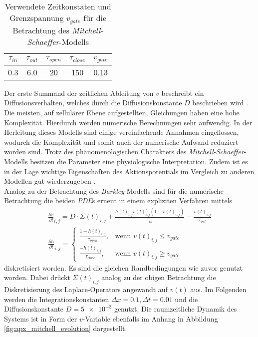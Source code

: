 \begin{table}[H]
\centering
\begin{tabular}{ccccc}
\hline 
$\tau_{in}$ & $\tau_{out}$ & $\tau_{open}$ & $\tau_{close}$ & $v_{gate}$ \\ 
\hline
0.3 & 6.0 & 20 & 150 & 0.13 \\ 
\hline 
\end{tabular} 
\caption{Verwendete Zeitkonstaten und Grenzspannung $v_{gate}$ für die Betrachtung des \textit{Mitchell-Schaeffer}-Modells}
\label{tab:ms_parameters}
\end{table}

Der erste Summand der zeitlichen Ableitung von $v$ beschreibt ein Diffusionsverhalten, welches durch die Diffusionskonstante $D$ beschrieben wird \citep{talbot2013towards}.\\

Die meisten, auf zellulärer Ebene aufgestellten, Gleichungen haben eine hohe Komplexität. Hierdurch werden numerische Berechnungen sehr aufwendig. In der Herleitung dieses Modells sind einige vereinfachende Annahmen eingeflossen, wodurch die Komplexität und somit auch der numerische Aufwand reduziert worden sind. Trotz des phänomenologischen Charakters des \textit{Mitchell-Schaeffer}-Modells besitzen die Parameter eine physiologische Interpretation. Zudem ist es in der Lage wichtige Eigenschaften des Aktionspotentials im Vergleich zu anderen Modellen gut wiederzugeben \citep{talbot2013towards}.\\

Analog zu der Betrachtung des \textit{Barkley}-Modells sind für die numerische Betrachtung die beiden \textit{PDE}s erneut in einem expliziten Verfahren mittels
\begin{equation}
\begin{gathered}
\frac{\partial v}{\partial t}_{i,j} = D \cdot \Sigma(t)_{i,j} + \frac{h(t)_{i,j} v(t)_{i,j}^2(1-v(t)_{i,j})}{\tau_{in}} - \frac{v(t)_{i,j}}{\tau_{out}}\\
\frac{\partial h}{\partial t}_{i,j} = \begin{cases}
	\frac{1-h(t)_{i,j}}{\tau_{open}},& \text{wenn } v(t)_{i,j} \leq v_{gate}\\
    \frac{-h(t)_{i,j}}{\tau_{close}},& \text{wenn } v(t)_{i,j} \geq v_{gate}
\end{cases}
\end{gathered}
\end{equation}
diskretisiert worden. Es sind die gleichen Randbedingungen wie zuvor genutzt worden. Dabei drückt $\Sigma(t)_{i, j}$ analog zu der obigen Betrachtung die Diskretisierung des Laplace-Operators angewandt auf $v(t)$ aus. Im Folgenden werden die Integrationskonstanten $\Delta x = 0.1, \Delta t = 0.01$ und die Diffusionskonstante $D = \num{5e-3}$ genutzt. Die raumzeitliche Dynamik des Systems ist in Form der $v$-Variable ebenfalls im Anhang in Abbildung \ref{fig:apx_mitchell_evolution} dargestellt.\\